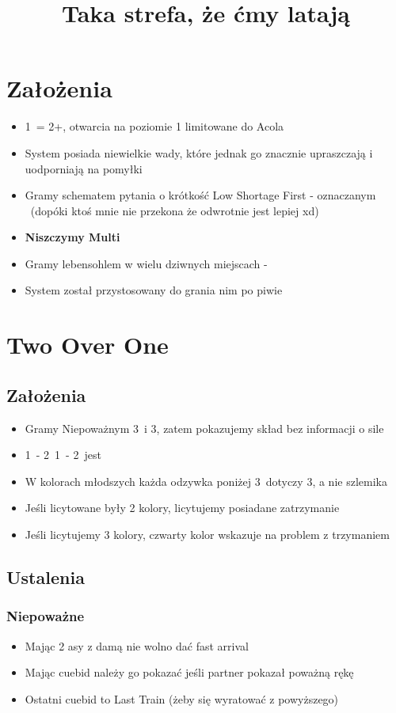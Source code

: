 \documentclass[12pt, a4paper]{article}
\title{\vspace{-2cm}Taka strefa, że ćmy latają}
\author{}
\date{}
\begin{document}
\maketitle
\section{Założenia}
\begin{itemize}
    \item 1\clubs\ = 2+\clubs, otwarcia na poziomie 1 limitowane do Acola
    \item System posiada niewielkie wady, które jednak go znacznie upraszczają i uodporniają na pomyłki
    \item Gramy schematem pytania o krótkość Low Shortage First  - oznaczanym \lsf\ (dopóki ktoś mnie nie przekona że odwrotnie jest lepiej xd)
    \item \textbf{Niszczymy Multi} \imp
    \item Gramy lebensohlem w wielu dziwnych miejscach - \leb
    \item System został przystosowany do grania nim po piwie
\end{itemize}


\pagebreak
\section{Two Over One}
\subsection*{Założenia}
\begin{itemize}
    \item Gramy Niepoważnym 3\spades\ i 3\nt, zatem pokazujemy skład bez informacji o sile
    \item 1\clubs\ - 2\clubs\, 1\clubs\ - 2\diams\ jest \gf
    \item W kolorach młodszych każda odzywka poniżej 3\nt\ dotyczy 3\nt, a nie szlemika
    \item Jeśli licytowane były 2 kolory, licytujemy posiadane zatrzymanie
    \item Jeśli licytujemy 3 kolory, czwarty kolor wskazuje na problem z trzymaniem
\end{itemize}

\subsection*{Ustalenia}
\subsubsection*{Niepoważne}
\begin{itemize}
    \item Mając 2 asy z damą nie wolno dać fast arrival
    \item Mając cuebid należy go pokazać jeśli partner pokazał poważną rękę
    \item Ostatni cuebid to Last Train (żeby się wyratować z powyższego)
\end{itemize}
\end{document}
